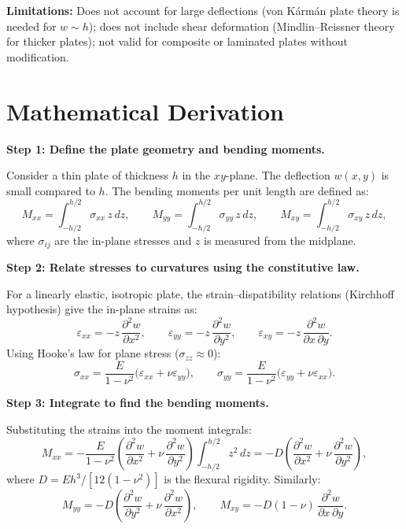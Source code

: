 \textbf{Limitations:} Does not account for large deflections (von Kármán plate theory is needed for $w \sim h$); does not include shear deformation (Mindlin--Reissner theory for thicker plates); not valid for composite or laminated plates without modification.


\section*{Mathematical Derivation}

\textbf{Step 1: Define the plate geometry and bending moments.}

Consider a thin plate of thickness $h$ in the $xy$-plane. The deflection $w(x,y)$ is small compared to $h$. The bending moments per unit length are defined as:
\begin{equation}
M_{xx} = \int_{-h/2}^{h/2} \sigma_{xx}\,z\,dz, \qquad M_{yy} = \int_{-h/2}^{h/2} \sigma_{yy}\,z\,dz, \qquad M_{xy} = \int_{-h/2}^{h/2} \sigma_{xy}\,z\,dz,
\end{equation}
where $\sigma_{ij}$ are the in-plane stresses and $z$ is measured from the midplane.

\textbf{Step 2: Relate stresses to curvatures using the constitutive law.}

For a linearly elastic, isotropic plate, the strain--dispatibility relations (Kirchhoff hypothesis) give the in-plane strains as:
\begin{equation}
\varepsilon_{xx} = -z\,\frac{\partial^{2}w}{\partial x^{2}}, \qquad \varepsilon_{yy} = -z\,\frac{\partial^{2}w}{\partial y^{2}}, \qquad \varepsilon_{xy} = -z\,\frac{\partial^{2}w}{\partial x\,\partial y}.
\end{equation}
Using Hooke's law for plane stress ($\sigma_{zz} \approx 0$):
\begin{equation}
\sigma_{xx} = \frac{E}{1-\nu^{2}}\bigl(\varepsilon_{xx} + \nu\varepsilon_{yy}\bigr), \qquad \sigma_{yy} = \frac{E}{1-\nu^{2}}\bigl(\varepsilon_{yy} + \nu\varepsilon_{xx}\bigr).
\end{equation}

\textbf{Step 3: Integrate to find the bending moments.}

Substituting the strains into the moment integrals:
\begin{equation}
M_{xx} = -\frac{E}{1-\nu^{2}}\!\left(\frac{\partial^{2}w}{\partial x^{2}} + \nu\,\frac{\partial^{2}w}{\partial y^{2}}\right)\!\int_{-h/2}^{h/2} z^{2}\,dz = -D\!\left(\frac{\partial^{2}w}{\partial x^{2}} + \nu\,\frac{\partial^{2}w}{\partial y^{2}}\right),
\end{equation}
where $D = Eh^{3}/[12(1-\nu^{2})]$ is the flexural rigidity. Similarly:
\begin{equation}
M_{yy} = -D\!\left(\frac{\partial^{2}w}{\partial y^{2}} + \nu\,\frac{\partial^{2}w}{\partial x^{2}}\right), \qquad M_{xy} = -D(1-\nu)\,\frac{\partial^{2}w}{\partial x\,\partial y}.
\end{equation}

